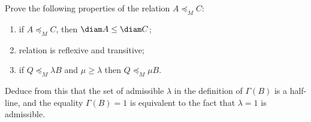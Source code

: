 \documentclass[a4paper,12pt]{report}
\begin{document}
\begin{task}
Prove the following properties of the relation $A\preceq_M C$\textup{:}
\begin{enumerate}
\item[(a)] if $A\preceq_M C$, then $\diam A\le\diam C$\textup{;}
\item[(b)] relation is reflexive and transitive\textup{;}
\item[(c)] if $Q\preceq_M\lambda B$ and $\mu\ge\lambda$ then $Q\preceq_M\mu B$.
\end{enumerate}
Deduce from this that the set of admissible $\lambda$ in the definition of $\Gamma(B)$ is a half-line, and the equality $\Gamma(B)=1$ is equivalent to the fact that $\lambda=1$ is admissible.

\end{task}
\end{document}

